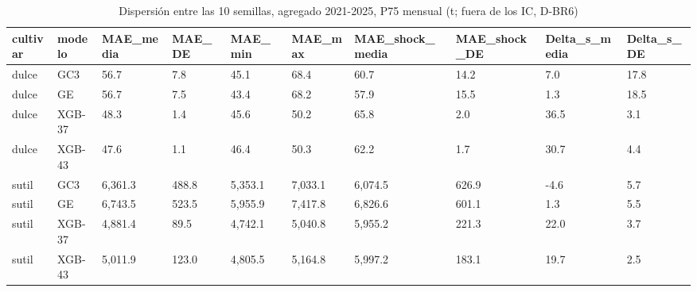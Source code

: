 \begin{table}[H]
\centering
\small
\caption{Dispersión entre las 10 semillas, agregado 2021-2025, P75 mensual (t; fuera de los IC, D-BR6)}
\label{tab:T07_dispersion_semillas}
\begin{tabular}{llllllllll}
\toprule
cultivar & modelo & MAE\_media & MAE\_DE & MAE\_min & MAE\_max & MAE\_shock\_media & MAE\_shock\_DE & Delta\_s\_media & Delta\_s\_DE \\
\midrule
dulce & GC3 & 56.7 & 7.8 & 45.1 & 68.4 & 60.7 & 14.2 & 7.0 & 17.8 \\
dulce & GE & 56.7 & 7.5 & 43.4 & 68.2 & 57.9 & 15.5 & 1.3 & 18.5 \\
dulce & XGB-37 & 48.3 & 1.4 & 45.6 & 50.2 & 65.8 & 2.0 & 36.5 & 3.1 \\
dulce & XGB-43 & 47.6 & 1.1 & 46.4 & 50.3 & 62.2 & 1.7 & 30.7 & 4.4 \\
sutil & GC3 & 6,361.3 & 488.8 & 5,353.1 & 7,033.1 & 6,074.5 & 626.9 & -4.6 & 5.7 \\
sutil & GE & 6,743.5 & 523.5 & 5,955.9 & 7,417.8 & 6,826.6 & 601.1 & 1.3 & 5.5 \\
sutil & XGB-37 & 4,881.4 & 89.5 & 4,742.1 & 5,040.8 & 5,955.2 & 221.3 & 22.0 & 3.7 \\
sutil & XGB-43 & 5,011.9 & 123.0 & 4,805.5 & 5,164.8 & 5,997.2 & 183.1 & 19.7 & 2.5 \\
\bottomrule
\end{tabular}
\end{table}